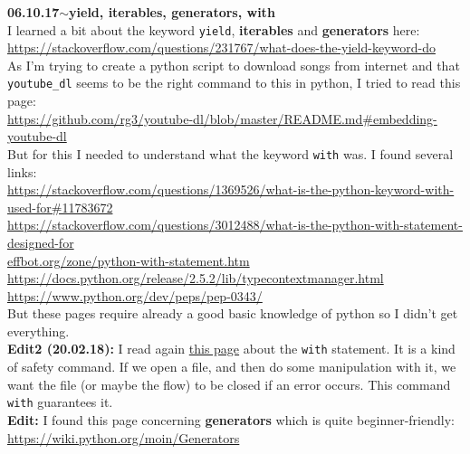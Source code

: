 \documentclass[11pt,a4paper]{article}
\newenvironment{loggentry}[2]%
{\noindent\textbf{#1}\hspace{1cm}$\mathbf{\sim}$\text{ }\textbf{#2}\\}{\vspace{0.5cm}}
\begin{document}
\begin{loggentry}{06.10.17}{yield, iterables, generators, with}
I learned a bit about the keyword \texttt{yield}, \textbf{iterables} and \textbf{generators} here:\\
\url{https://stackoverflow.com/questions/231767/what-does-the-yield-keyword-do}\\
As I'm trying to create a python script to download songs from internet and that \texttt{youtube\_dl} seems to be the right command to this in python, I tried to read this page:\\
\url{https://github.com/rg3/youtube-dl/blob/master/README.md#embedding-youtube-dl}\\
But for this I needed to understand what the keyword \texttt{with} was. I found several links:\\
\url{https://stackoverflow.com/questions/1369526/what-is-the-python-keyword-with-used-for#11783672}\\
\url{https://stackoverflow.com/questions/3012488/what-is-the-python-with-statement-designed-for}\\
\url{effbot.org/zone/python-with-statement.htm}\\
\url{https://docs.python.org/release/2.5.2/lib/typecontextmanager.html}
\url{https://www.python.org/dev/peps/pep-0343/}\\
But these pages require already a good basic knowledge of python so I didn't get everything.\\
\textbf{Edit2 (20.02.18):} I read again \href{https://stackoverflow.com/questions/1369526/what-is-the-python-keyword-with-used-for#11783672}{this page} about the \texttt{with} statement. It is a kind of safety command. If we open a file, and then do some manipulation with it, we want the file (or maybe the flow) to be closed if an error occurs. This command \texttt{with} guarantees it.\\
\textbf{Edit:} I found this page concerning \textbf{generators} which is quite beginner-friendly:\\
\url{https://wiki.python.org/moin/Generators}
\end{loggentry}
\end{document}

